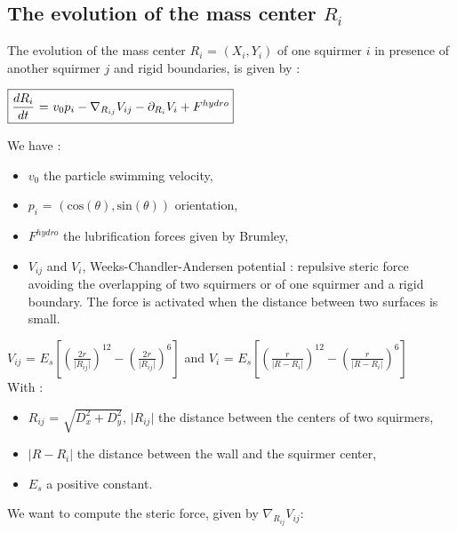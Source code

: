 \documentclass{article}
\begin{document}
\subsection{The evolution of the mass center $R_i$}
The evolution of the mass center $R_i$ = $(X_i, Y_i)$ of one squirmer $i$ in presence of 
another squirmer $j$ and rigid boundaries, is given by :
\begin{center}
$\boxed{\frac{dR_i}{dt}$ = $v_0 p_i -  \nabla_{R_{ij}} V_{ij} - \partial_{R_i} V_i + F^{hydro}}$
\end{center}
We have : \begin{itemize}
    \item $v_0$ the particle swimming velocity,
    \item $p_i$ = $(\mathrm{cos}(\theta),\mathrm{sin}(\theta))$ orientation,
    \item $F^{hydro}$ the lubrification forces given by Brumley\cite{Brumley},
    \item $V_{ij}$ and $V_i$, Weeks-Chandler-Andersen potential : repulsive steric force avoiding the overlapping of two squirmers or of one squirmer and a rigid boundary. The force is activated when the distance between two surfaces is small.
\end{itemize} 
\vspace{0,5cm}
$V_{ij}$ = $E_s\left[\left(\frac{2r}{\lvert R_{ij}\rvert}\right)^{12} - \left(\frac{2r}{\lvert R_{ij}\rvert}\right)^6\right]$ and  $V_i$ = $E_s \left[ \left( \frac{r}{\lvert R - R_i \rvert} \right)^{12} - \left( \frac{r}{\lvert R - R_i \rvert} \right) ^6 \right]$ 
\vspace{0,3cm}
\\With : \begin{itemize}
    \item $R_{ij}$ = $\sqrt{D_x^2+D_y^2}$, $\lvert R_{ij} \rvert$ the distance between the centers of two squirmers,
    \item $\lvert R - R_i\rvert$ the distance between the wall and the squirmer center,
    \item $E_s$ a positive constant.
\end{itemize}

\vspace{0,5cm}
We want to compute the steric force, given by $\nabla_{R_{ij}} V_{ij}$:
\end{document}
